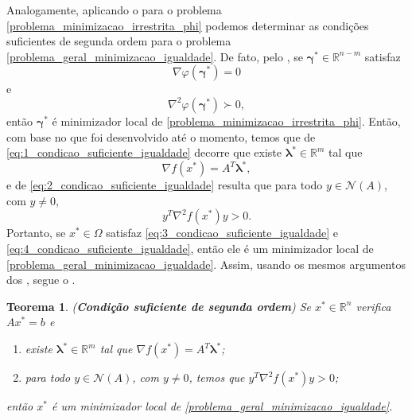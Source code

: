 \documentclass[12pt,a4paper]{scrartcl}
\def\RR{\mathds{R}}
\newtheorem{teo}{Teorema}
\theoremstyle{definition}%
\begin{document}
Analogamente, aplicando o  para o problema \eqref{problema_minimizacao_irrestrita_phi} podemos determinar as condições suficientes de segunda ordem para o problema \eqref{problema_geral_minimizacao_igualdade}. De fato, pelo , se $\boldsymbol{\gamma}^{*} \in \RR^{n-m}$ satisfaz
\[ \label{eq:1_condicao_suficiente_igualdade}
\nabla \varphi(\boldsymbol{\gamma}^{*}) =0
\] 
e
\[ \label{eq:2_condicao_suficiente_igualdade}
\nabla^{2} \varphi(\boldsymbol{\gamma}^{*}) \succ 0,
\]
então $\boldsymbol{\gamma}^{*}$ é minimizador local de \eqref{problema_minimizacao_irrestrita_phi}. Então, com base no que foi desenvolvido até o momento, temos que de \eqref{eq:1_condicao_suficiente_igualdade} decorre que existe $\boldsymbol{\lambda}^{*} \in \RR^{m}$ tal que
\[ \label{eq:3_condicao_suficiente_igualdade}
\nabla f(x^{*}) = A^{T} \boldsymbol{\lambda}^{*} ,
\]
e de \eqref{eq:2_condicao_suficiente_igualdade} resulta que para todo $y \in \mathcal{N}(A)$, com $y \neq 0$, 
\[ \label{eq:4_condicao_suficiente_igualdade}
y^{T}\nabla^{2} f(x^{*})y > 0.
\]
Portanto, se $x^{*} \in \Omega$ satisfaz \eqref{eq:3_condicao_suficiente_igualdade} e \eqref{eq:4_condicao_suficiente_igualdade}, então ele é um minimizador local de \eqref{problema_geral_minimizacao_igualdade}. Assim, usando os mesmos argumentos dos , segue o . 

\begin{teo}(\textbf{Condição suficiente de segunda ordem}) \label{teo:condicao_suficiente_2ordem_igualdade}
Se ${x}^{*} \in \RR^{n}$ verifica $A{x}^{*} = b$ e 
\begin{enumerate}
	\item[(i)] existe $\boldsymbol{\lambda}^{*} \in \RR^{m}$ tal que $\nabla f({x}^{*}) = A^{T}\boldsymbol{\lambda}^{*}$;
	\item[(ii)] para todo $y \in \mathcal{N}(A)$, com $y\neq 0$, temos que $y^{T}\nabla^{2} f(x^{*})y > 0$; 
\end{enumerate}
então ${x}^{*}$ é um minimizador local de \eqref{problema_geral_minimizacao_igualdade}.
\end{teo}
\end{document}

